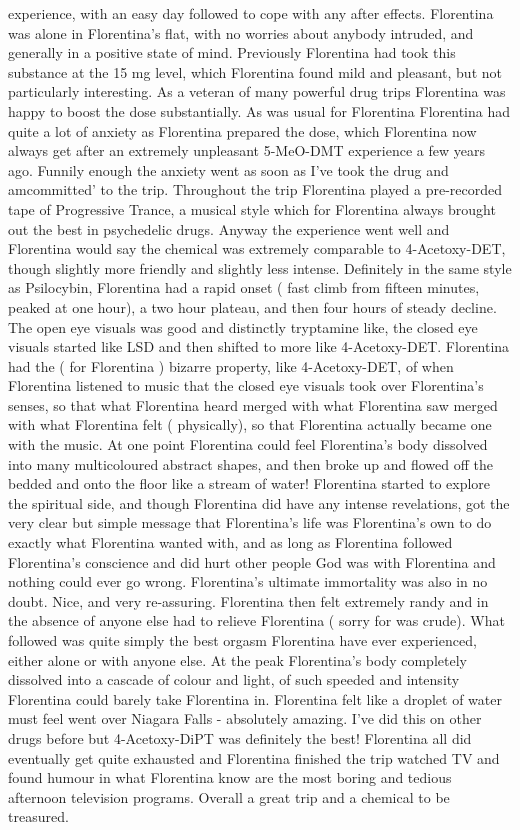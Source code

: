 \documentclass[12pt]{book}
\begin{document}
experience, with an easy day followed to cope with any after effects. Florentina was alone in Florentina's flat, with no worries about anybody intruded, and generally in a positive state of mind. Previously Florentina had took this substance at the 15 mg level, which Florentina found mild and pleasant, but not particularly interesting. As a veteran of many powerful drug trips Florentina was happy to boost the dose substantially. As was usual for Florentina Florentina had quite a lot of anxiety as Florentina prepared the dose, which Florentina now always get after an extremely unpleasant 5-MeO-DMT experience a few years ago. Funnily enough the anxiety went as soon as I've took the drug and amcommitted' to the trip. Throughout the trip Florentina played a pre-recorded tape of Progressive Trance, a musical style which for Florentina always brought out the best in psychedelic drugs. Anyway the experience went well and Florentina would say the chemical was extremely comparable to 4-Acetoxy-DET, though slightly more friendly and slightly less intense. Definitely in the same style as Psilocybin, Florentina had a rapid onset ( fast climb from fifteen minutes, peaked at one hour), a two hour plateau, and then four hours of steady decline. The open eye visuals was good and distinctly tryptamine like, the closed eye visuals started like LSD and then shifted to more like 4-Acetoxy-DET. Florentina had the ( for Florentina ) bizarre property, like 4-Acetoxy-DET, of when Florentina listened to music that the closed eye visuals took over Florentina's senses, so that what Florentina heard merged with what Florentina saw merged with what Florentina felt ( physically), so that Florentina actually became one with the music. At one point Florentina could feel Florentina's body dissolved into many multicoloured abstract shapes, and then broke up and flowed off the bedded and onto the floor like a stream of water! Florentina started to explore the spiritual side, and though Florentina did have any intense revelations, got the very clear but simple message that Florentina's life was Florentina's own to do exactly what Florentina wanted with, and as long as Florentina followed Florentina's conscience and did hurt other people God was with Florentina and nothing could ever go wrong. Florentina's ultimate immortality was also in no doubt. Nice, and very re-assuring. Florentina then felt extremely randy and in the absence of anyone else had to relieve Florentina ( sorry for was crude). What followed was quite simply the best orgasm Florentina have ever experienced, either alone or with anyone else. At the peak Florentina's body completely dissolved into a cascade of colour and light, of such speeded and intensity Florentina could barely take Florentina in. Florentina felt like a droplet of water must feel went over Niagara Falls - absolutely amazing. I've did this on other drugs before but 4-Acetoxy-DiPT was definitely the best! Florentina all did eventually get quite exhausted and Florentina finished the trip watched TV and found humour in what Florentina know are the most boring and tedious afternoon television programs. Overall a great trip and a chemical to be treasured.
\end{document}
